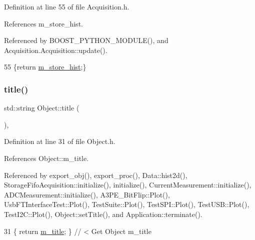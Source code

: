 Definition at line 55 of file Acquisition.\+h.



References m\+\_\+store\+\_\+hist.



Referenced by B\+O\+O\+S\+T\+\_\+\+P\+Y\+T\+H\+O\+N\+\_\+\+M\+O\+D\+U\+L\+E(), and Acquisition.\+Acquisition\+::update().


\begin{DoxyCode}
55 \{\textcolor{keywordflow}{return} \hyperlink{classAcquisition_a08f70edd83751dbdab4c8190dc4b9188}{m\_store\_hist};\}
\end{DoxyCode}
\mbox{\label{classObject_a73a0f1a41828fdd8303dd662446fb6c3}} 
\subsubsection{\texorpdfstring{title()}{title()}}
{\footnotesize\ttfamily std\+::string Object\+::title (\begin{DoxyParamCaption}{ }\end{DoxyParamCaption})\hspace{0.3cm}{\ttfamily [inline]}, {\ttfamily [inherited]}}



Definition at line 31 of file Object.\+h.



References Object\+::m\+\_\+title.



Referenced by export\+\_\+obj(), export\+\_\+proc(), Data\+::hist2d(), Storage\+Fifo\+Acquisition\+::initialize(), initialize(), Current\+Measurement\+::initialize(), A\+D\+C\+Measurement\+::initialize(), A3\+P\+E\+\_\+\+Bit\+Flip\+::\+Plot(), Usb\+F\+T\+Interface\+Test\+::\+Plot(), Test\+Suite\+::\+Plot(), Test\+S\+P\+I\+::\+Plot(), Test\+U\+S\+B\+::\+Plot(), Test\+I2\+C\+::\+Plot(), Object\+::set\+Title(), and Application\+::terminate().


\begin{DoxyCode}
31 \{ \textcolor{keywordflow}{return} \hyperlink{classObject_affbeea1953eb5163573b92fad8f75727}{m\_title};      \} \textcolor{comment}{// < Get Object m\_title}
\end{DoxyCode}
\mbox{\label{classAcquisition_a6f680938eb6a42d57dfa7466e8852af9}} 
